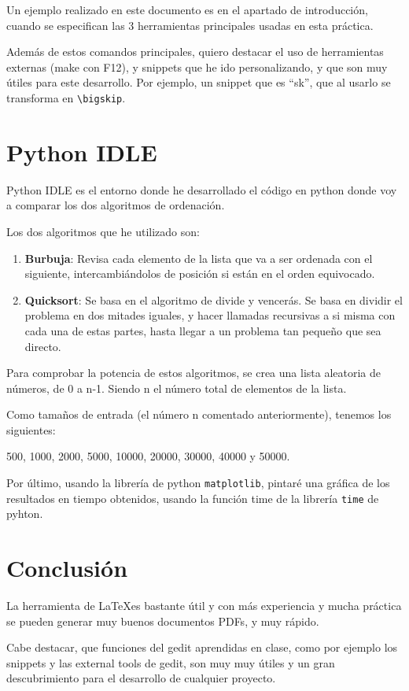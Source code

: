 \documentclass[a4,12pt]{article}
\begin{document}
Un ejemplo realizado en este documento es en el apartado de introducción, cuando se especifican las 3 herramientas principales usadas en esta práctica.

\bigskip
Además de estos comandos principales, quiero destacar el uso de herramientas externas (make con F12), y snippets que he ido personalizando, y que son muy útiles para este desarrollo. Por ejemplo, un snippet que es ``sk'', que al usarlo se transforma en \verb+\bigskip+.

\newpage
\section{Python IDLE}
Python IDLE es el entorno donde he desarrollado el código en python donde voy a comparar los dos algoritmos de ordenación.

\bigskip
\noindent Los dos algoritmos que he utilizado son:
\begin{enumerate}

\item \textbf{Burbuja}: Revisa cada elemento de la lista que va a ser ordenada con el siguiente, intercambiándolos de posición si están en el orden equivocado.

\item \textbf{Quicksort}: Se basa en el algoritmo de divide y vencerás. Se basa en dividir el problema en dos mitades iguales, y hacer llamadas recursivas a si misma con cada una de estas partes, hasta llegar a un problema tan pequeño que sea directo.
\end{enumerate}

\noindent Para comprobar la potencia de estos algoritmos, se crea una lista aleatoria de números, de 0 a n-1. Siendo n el número total de elementos de la lista.

\bigskip
Como tamaños de entrada (el número n comentado anteriormente), tenemos los siguientes:

500, 1000, 2000, 5000, 10000, 20000, 30000, 40000 y 50000.

\bigskip
Por último, usando la librería de python \texttt{matplotlib}, pintaré una gráfica de los resultados en tiempo obtenidos, usando la función time de la librería \texttt{time} de pyhton.

\newpage
\section{Conclusión}
La herramienta de \LaTeX es bastante útil y con más experiencia y mucha práctica se pueden generar muy buenos documentos PDFs, y muy rápido.

Cabe destacar, que funciones del gedit aprendidas en clase, como por ejemplo los snippets y las external tools de gedit, son muy muy útiles y un gran descubrimiento para el desarrollo de cualquier proyecto.
\end{document}
